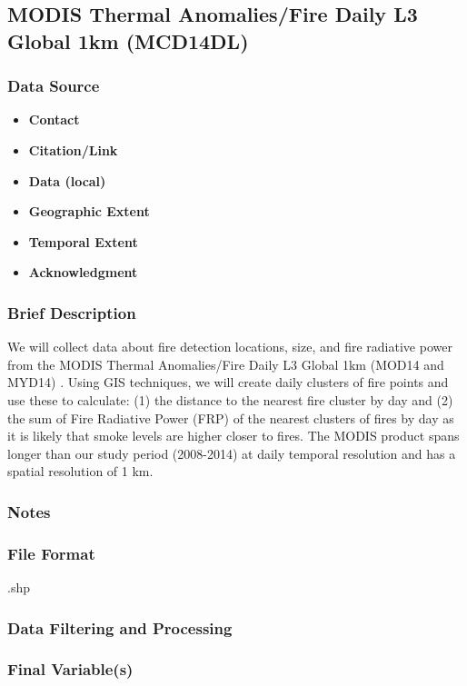 \subsection{MODIS Thermal Anomalies/Fire Daily L3 Global 1km (MCD14DL)}
\subsubsection*{Data Source}
\begin{itemize}[nolistsep]
\item \textbf{Contact}
\item \textbf{Citation/Link}
\item \textbf{Data (local)}
\item \textbf{Geographic Extent}
\item \textbf{Temporal Extent}
\item \textbf{Acknowledgment}
\end{itemize}
\subsubsection*{Brief Description}

We will collect data about fire detection locations, size, and fire radiative power from the MODIS Thermal Anomalies/Fire Daily L3 Global 1km (MOD14 and MYD14) \citep{Giglio2006,Hawbaker2017}. 
Using GIS techniques, we will create daily clusters of fire points and use these to calculate: (1) the distance to the nearest fire cluster by day and (2) the sum of Fire Radiative Power (FRP) of the nearest clusters of fires by day as it is likely that smoke levels are higher closer to fires. The MODIS product spans longer than our study period (2008-2014) at daily temporal resolution and has a spatial resolution of 1 km.

\subsubsection*{Notes}
\subsubsection*{File Format} .shp
\subsubsection*{Data Filtering and Processing}
\subsubsection*{Final Variable(s)}
